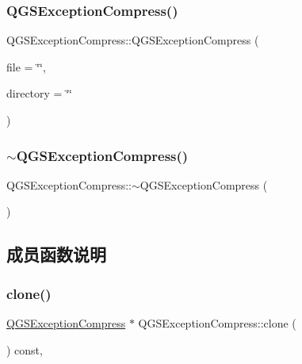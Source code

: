 \subsubsection{\texorpdfstring{Q\+G\+S\+Exception\+Compress()}{QGSExceptionCompress()}}
{\footnotesize\ttfamily Q\+G\+S\+Exception\+Compress\+::\+Q\+G\+S\+Exception\+Compress (\begin{DoxyParamCaption}\item[{const Q\+String \&}]{file = {\ttfamily \char`\"{}\char`\"{}},  }\item[{const Q\+String \&}]{directory = {\ttfamily \char`\"{}\char`\"{}} }\end{DoxyParamCaption})}

\mbox{\label{class_q_g_s_exception_compress_a0640ba6ffb83609e722f8180caa3e24e}} 
\subsubsection{\texorpdfstring{$\sim$\+Q\+G\+S\+Exception\+Compress()}{~QGSExceptionCompress()}}
{\footnotesize\ttfamily Q\+G\+S\+Exception\+Compress\+::$\sim$\+Q\+G\+S\+Exception\+Compress (\begin{DoxyParamCaption}{ }\end{DoxyParamCaption})\hspace{0.3cm}{\ttfamily [virtual]}}



\subsection{成员函数说明}
\mbox{\label{class_q_g_s_exception_compress_a412b0b6d21a29dccc82b5672fe8f97d8}} 
\subsubsection{\texorpdfstring{clone()}{clone()}}
{\footnotesize\ttfamily \mbox{\hyperlink{class_q_g_s_exception_compress}{Q\+G\+S\+Exception\+Compress}} $\ast$ Q\+G\+S\+Exception\+Compress\+::clone (\begin{DoxyParamCaption}{ }\end{DoxyParamCaption}) const\hspace{0.3cm}{\ttfamily [override]}, {\ttfamily [virtual]}}



